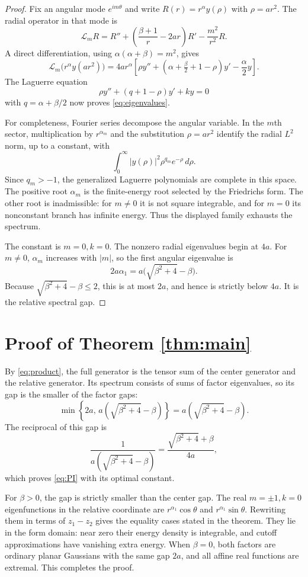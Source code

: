 \documentclass[11pt]{article}
\newcommand{\cL}{\mathcal L}
\begin{document}
\begin{proof}
Fix an angular mode $e^{im\theta}$ and write
$R(r)=r^\alpha y(\rho)$ with $\rho=ar^2$.  The radial operator in that mode is
\[
 \cL_mR=R''+\left(\frac{\beta+1}{r}-2ar\right)R'
           -\frac{m^2}{r^2}R.
\]
A direct differentiation, using $\alpha(\alpha+\beta)=m^2$, gives
\begin{equation}\label{eq:calculation}
 \cL_m\bigl(r^\alpha y(ar^2)\bigr)
 =4a r^\alpha\left[
 \rho y''+(\alpha+\tfrac\beta2+1-\rho)y'-\frac\alpha2y
 \right].
\end{equation}
The Laguerre equation
\[
 \rho y''+(q+1-\rho)y'+ky=0
\]
with $q=\alpha+\beta/2$ now proves
\eqref{eq:eigenvalues}.

For completeness, Fourier series decompose the angular variable.  In the
$m$th sector, multiplication by $r^{\alpha_m}$ and the substitution
$\rho=ar^2$ identify the radial $L^2$ norm, up to a constant, with
\[
 \int_0^\infty |y(\rho)|^2\rho^{q_m}e^{-\rho}\,d\rho.
\]
Since $q_m>-1$, the generalized Laguerre polynomials are complete in this
space.  The positive root $\alpha_m$ is the finite-energy root selected by
the Friedrichs form.  The other root is inadmissible: for $m\ne0$ it is not
square integrable, and for $m=0$ its nonconstant branch has infinite energy.
Thus the displayed family exhausts the spectrum.

The constant is $m=0,k=0$.  The nonzero radial eigenvalues begin at $4a$.
For $m\ne0$, $\alpha_m$ increases with $|m|$, so the first angular
eigenvalue is
\[
 2a\alpha_1=a\bigl(\sqrt{\beta^2+4}-\beta\bigr).
\]
Because $\sqrt{\beta^2+4}-\beta\leq2$, this is at most $2a$, and hence is
strictly below $4a$.  It is the relative spectral gap.
\end{proof}

\section{Proof of Theorem \ref{thm:main}}

By \eqref{eq:product}, the full generator is the tensor sum of the center
generator and the relative generator.  Its spectrum consists of sums of
factor eigenvalues, so its gap is the smaller of the factor gaps:
\[
 \min\left\{2a,\,a(\sqrt{\beta^2+4}-\beta)\right\}
 =a(\sqrt{\beta^2+4}-\beta).
\]
The reciprocal of this gap is
\[
 \frac1{a(\sqrt{\beta^2+4}-\beta)}
 =\frac{\sqrt{\beta^2+4}+\beta}{4a},
\]
which proves \eqref{eq:PI} with its optimal constant.

For $\beta>0$, the gap is strictly smaller than the center gap.  The real
$m=\pm1,k=0$ eigenfunctions in the relative coordinate are
$r^{\alpha_1}\cos\theta$ and $r^{\alpha_1}\sin\theta$.  Rewriting them in
terms of $z_1-z_2$ gives the equality cases stated in the theorem.  They lie
in the form domain: near zero their energy density is integrable, and cutoff
approximations have vanishing extra energy.  When $\beta=0$, both factors are
ordinary planar Gaussians with the same gap $2a$, and all affine real
functions are extremal.  This completes the proof.
\end{document}
